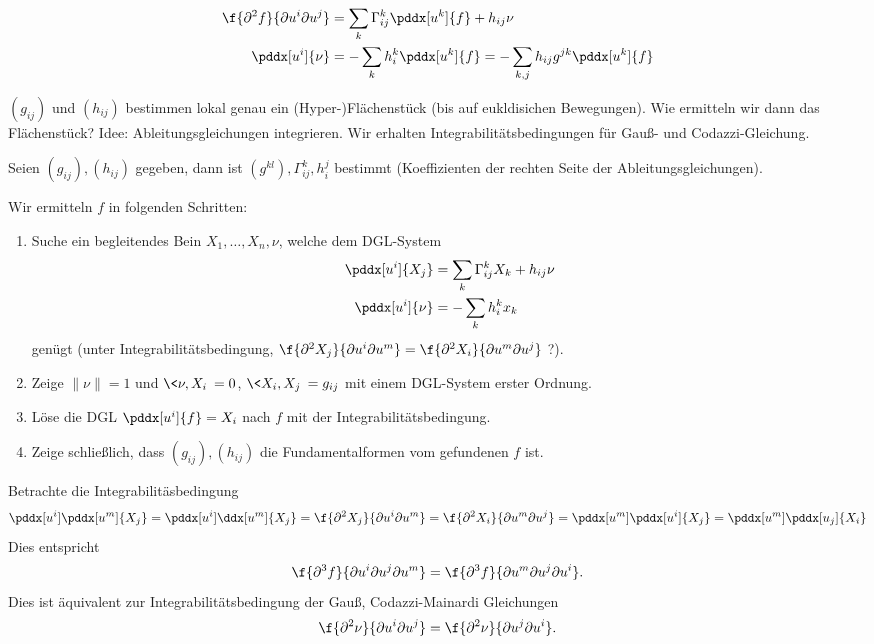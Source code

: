 \begin{align*}
	\f{\partial^2 f}{\partial u^i \partial u^j}
		&= \sum_{k} \Gamma_{ij}^k \pddx[u^k]{f} + h_{ij} \nu \\
	\pddx[u^i]{\nu}
		&= - \sum_k h_i^k \pddx[u^k]{f}
		= - \sum_{k,j} h_{ij} g^{jk} \pddx[u^k]{f}
\end{align*}

$(g_{ij})$ und $(h_{ij})$ bestimmen lokal genau ein (Hyper-)Flächenstück (bis auf eukldisichen Bewegungen).
Wie ermitteln wir dann das Flächenstück?
Idee: Ableitungsgleichungen integrieren.
Wir erhalten Integrabilitätsbedingungen für Gauß- und Codazzi-Gleichung.

Seien $(g_{ij}), (h_{ij})$ gegeben, dann ist $(g^{kl}), \Gamma_{ij}^k, h_i^j$ bestimmt (Koeffizienten der rechten Seite der Ableitungsgleichungen).

Wir ermitteln $f$ in folgenden Schritten:
\begin{enumerate}[1.]
	\item
		Suche ein begleitendes Bein $X_1, \dotsc, X_n, \nu$, welche dem DGL-System
		\begin{align*}
			\pddx[u^i]{X_j} &= \sum_k \Gamma_{ij}^k X_k + h_{ij} \nu \\
			\pddx[u^i]{\nu} &= -\sum_k h_i^k x_k
		\end{align*}
		genügt (unter Integrabilitätsbedingung, $\f{\partial^2 X_j}{\partial u^i\partial u^m} = \f{\partial^2 X_i}{\partial u^m \partial u^j}$ ?).
	\item
		Zeige $\|\nu\| = 1$ und $\<\nu, X_i\> = 0$, $\<X_i, X_j\> = g_{ij}$ mit einem DGL-System erster Ordnung.
	\item
		Löse die DGL $\pddx[u^i]{f} = X_i$ nach $f$ mit der Integrabilitätsbedingung.
	\item
		Zeige schließlich, dass $(g_{ij}), (h_{ij})$ die Fundamentalformen vom gefundenen $f$ ist.
\end{enumerate}


Betrachte die Integrabilitäsbedingung
\[
	\pddx[u^i] \pddx[u^m]{X_j} = \pddx[u^i] \ddx[u^m]{X_j} = \f{\partial^2 X_j}{\partial u^i \partial u^m}
	= \f{\partial^2 X_i}{\partial u^m \partial u^j} = \pddx[u^m] \pddx[u^i]{X_j} = \pddx[u^m] \pddx[u_j]{X_i}
\]
Dies entspricht
\[
	\f{\partial^3 f}{\partial u^i \partial u^j \partial u^m} = \f{\partial^3 f}{\partial u^m \partial u^j \partial u^i}.
\]
Dies ist äquivalent zur Integrabilitätsbedingung der Gauß, Codazzi-Mainardi Gleichungen
\[
	\f{\partial^2 \nu}{\partial u^i \partial u^j} = \f{\partial^2 \nu}{\partial u^j \partial u^i}.
\]

